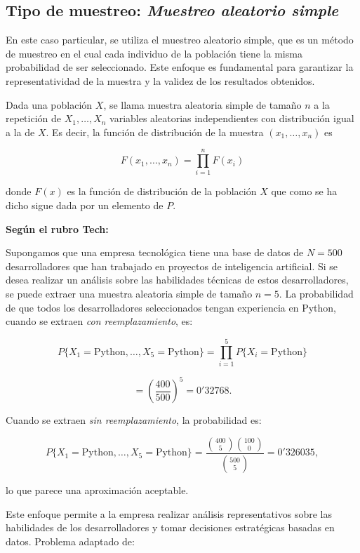 \subsection{Tipo de muestreo: \textit{Muestreo aleatorio simple}}

En este caso particular, se utiliza el muestreo aleatorio simple, que es un método de muestreo en el cual cada individuo de la población tiene la misma probabilidad de ser seleccionado. Este enfoque es fundamental para garantizar la representatividad de la muestra y la validez de los resultados obtenidos.

Dada una población \( X \), se llama muestra aleatoria simple de tamaño \( n \) a la repetición de \( X_1, \ldots, X_n \) variables aleatorias independientes con distribución igual a la de \( X \). Es decir, la función de distribución de la muestra \((x_1, \ldots, x_n)\) es

\[F(x_1, \ldots, x_n) = \prod_{i=1}^n F(x_i)\]

donde \( F(x) \) es la función de distribución de la población \( X \) que como se ha dicho sigue dada por un elemento de \( P \).

\textbf{Según el rubro Tech:}

Supongamos que una empresa tecnológica tiene una base de datos de \( N = 500 \) desarrolladores que han trabajado en proyectos de inteligencia artificial. Si se desea realizar un análisis sobre las habilidades técnicas de estos desarrolladores, se puede extraer una muestra aleatoria simple de tamaño \( n = 5 \). La probabilidad de que todos los desarrolladores seleccionados tengan experiencia en Python, cuando se extraen \textit{con reemplazamiento}, es:

\[P\{X_1 = \text{Python}, \ldots, X_5 = \text{Python}\} = \prod_{i=1}^{5} P\{X_i = \text{Python}\}\]

\[= \left( \frac{400}{500} \right)^5 = 0'32768.\]

Cuando se extraen \textit{sin reemplazamiento}, la probabilidad es:

\[P\{X_1 = \text{Python}, \ldots, X_5 = \text{Python}\} = \frac{\binom{400}{5} \binom{100}{0}}{\binom{500}{5}} = 0'326035,\]

lo que parece una aproximación aceptable.

Este enfoque permite a la empresa realizar análisis representativos sobre las habilidades de los desarrolladores y tomar decisiones estratégicas basadas en datos. Problema adaptado de: \cite{GomezVillegas}

